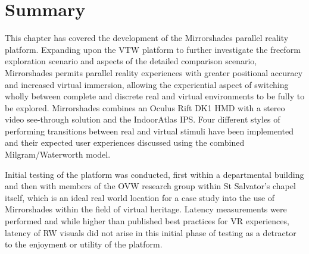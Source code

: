 
\section{Summary}
This chapter has covered the development of the Mirrorshades parallel reality platform. Expanding upon the VTW platform to further investigate the freeform exploration scenario and aspects of the detailed comparison scenario, Mirrorshades permits parallel reality experiences with greater positional accuracy and increased virtual immersion, allowing the experiential aspect of switching wholly between complete and discrete real and virtual environments to be fully to be explored. Mirrorshades combines an Oculus Rift DK1 HMD with a stereo video see-through solution and the IndoorAtlas IPS. Four different styles of performing transitions between real and virtual stimuli have been implemented and their expected user experiences discussed using the combined Milgram/Waterworth model.

Initial testing of the platform was conducted, first within a departmental building and then with members of the OVW research group within St Salvator's chapel itself, which is an ideal real world location for a case study into the use of Mirrorshades within the field of virtual heritage. Latency measurements were performed and while higher than published best practices for VR experiences, latency of RW visuals did not arise in this initial phase of testing as a detractor to the enjoyment or utility of the platform.

